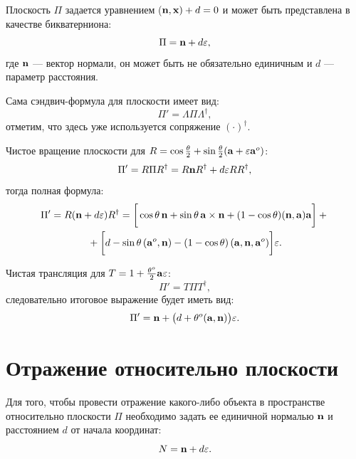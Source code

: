 Плоскость $\Pi$ задается уравнением ($\vb{n}, \vb{x}) + d = 0$ и может быть представлена в качестве бикватерниона:
\begin{equation*}
    \Pi = \vb{n} + d\varepsilon,
\end{equation*}
где $\vb{n}$ --- вектор нормали, он может быть не обязательно единичным и $d$ --- параметр расстояния.

Сама сэндвич-формула для плоскости имеет вид:
\begin{equation*}
    \Pi' = \Lambda \Pi \Lambda^\dagger,
\end{equation*}
отметим, что здесь уже используется сопряжение $(\cdot)^\dagger$.

Чистое вращение плоскости для $R = \cos\frac{\theta}{2} + \sin\frac{\theta}{2}(\vb{a} + \varepsilon\vb{a}^o)$:
\begin{equation*}
    \Pi' = R \Pi R^\dagger = R\vb{n}R^\dagger + d\varepsilon RR^\dagger,
\end{equation*}
тогда полная формула:
\begin{multline*}
    \Pi' = R(\vb{n} + d\varepsilon)R^\dagger = \bigg[ \cos\theta\,\vb{n} + \sin\theta\,\vb{a}\times\vb{n} + (1-\cos\theta)(\vb{n},\vb{a})\vb{a} \bigg] +{}\\
    {}+ \bigg[ d - \sin\theta\,(\vb{a}^o,\vb{n}) - (1-\cos\theta)\,(\vb{a},\vb{n},\vb{a}^o) \bigg] \varepsilon.
\end{multline*}

Чистая трансляция для $T = 1 + \frac{\theta^o}{2}\vb{a}\varepsilon$:
\begin{equation*}
    \Pi' = T \Pi T^\dagger,
\end{equation*}
следовательно итоговое выражение будет иметь вид:
\begin{equation*}
    \Pi' = \vb{n} + \big(d + \theta^o(\vb{a},\vb{n})\big)\varepsilon.
\end{equation*}

\section{Отражение относительно плоскости}
\label{sec:Reflection}

Для того, чтобы провести отражение какого-либо объекта в пространстве относительно плоскости $\Pi$ необходимо задать ее единичной нормалью $\vb{n}$ и расстоянием $d$ от начала координат:
\begin{equation*}
    N = \vb{n} + d\varepsilon.
\end{equation*}

